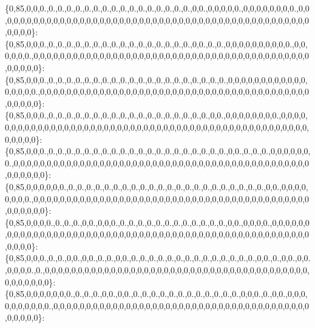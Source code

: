 \{0,85,0,0,0.,0.,0.,0.,0.,0.,0.,0.,0.,0.,0.,0.,0.,0.,0.,0.,0.,0,0.,0,0,0,0,0.,0,0,0,0,0,0,0,0.,0,0,0,0,0,0,0,0,0,0,0,0,0,0,0,0,0,0,0,0,0,0,0,0,0,0,0,0,0,0,0,0,0,0,0,0,0,0,0,0,0,0,0,0,0,0,0,0,0,0,0,0\}\+: \{0,85,0,0,0.,0.,0.,0.,0.,0.,0.,0.,0.,0.,0.,0.,0.,0.,0.,0.,0.,0,0.,0.,0.,0,0,0,0,0,0,0,0,0,0.,0,0,0,0,0,0.,0,0,0,0,0,0,0,0,0,0,0,0,0,0,0,0,0,0,0,0,0,0,0,0,0,0,0,0,0,0,0,0,0,0,0,0,0,0,0,0,0,0,0,0,0,0,0\}\+: \{0,85,0,0,0.,0.,0.,0.,0.,0.,0.,0.,0.,0.,0.,0.,0.,0.,0.,0.,0.,0.,0.,0.,0.,0,0,0,0,0,0,0,0,0,0,0,0,0,0,0,0,0.,0,0,0,0,0,0,0,0,0,0,0,0,0,0,0,0,0,0,0,0,0,0,0,0,0,0,0,0,0,0,0,0,0,0,0,0,0,0,0,0,0,0,0,0,0,0\}\+: \{0,85,0,0,0.,0.,0.,0.,0.,0.,0.,0.,0.,0.,0.,0.,0.,0.,0.,0.,0.,0.,0.,0,0.,0,0,0,0,0,0,0,0.,0,0,0,0,0,0,0,0,0,0,0,0,0,0,0,0,0,0,0,0,0,0,0,0,0,0,0,0,0,0,0,0,0,0,0,0,0,0,0,0,0,0,0,0,0,0,0,0,0,0,0,0,0,0,0\}\+: \{0,85,0,0,0.,0.,0.,0.,0.,0.,0.,0.,0.,0.,0.,0.,0.,0.,0.,0.,0.,0.,0.,0.,0.,0,0.,0.,0.,0.,0,0,0,0,0,0,0.,0,0,0,0,0,0,0,0,0,0,0,0,0,0,0,0,0,0,0,0,0,0,0,0,0,0,0,0,0,0,0,0,0,0,0,0,0,0,0,0,0,0,0,0,0,0,0,0,0,0,0\}\+: \{0,85,0,0,0,0,0,0.,0.,0.,0.,0.,0.,0.,0.,0.,0.,0.,0.,0.,0.,0.,0.,0.,0.,0.,0.,0.,0.,0.,0,0.,0,0,0,0,0,0,0,0.,0,0,0,0,0,0,0,0,0,0,0,0,0,0,0,0,0,0,0,0,0,0,0,0,0,0,0,0,0,0,0,0,0,0,0,0,0,0,0,0,0,0,0,0,0,0,0,0\}\+: \{0,85,0,0,0,0.,0.,0.,0.,0,0.,0,0,0.,0.,0.,0.,0.,0.,0.,0.,0.,0.,0.,0.,0.,0,0.,0,0,0,0.,0,0,0,0,0,0,0,0,0,0,0,0,0,0,0,0,0,0,0,0,0,0,0,0,0,0,0,0,0,0,0,0,0,0,0,0,0,0,0,0,0,0,0,0,0,0,0,0,0,0,0,0,0,0,0,0\}\+: \{0,85,0,0,0.,0.,0.,0,0.,0,0.,0.,0.,0,0.,0.,0.,0.,0.,0.,0.,0.,0.,0.,0.,0.,0.,0.,0.,0,0.,0.,0,0.,0,0.,0,0,0,0.,0.,0,0,0,0,0,0,0,0,0,0,0,0,0,0,0,0,0,0,0,0,0,0,0,0,0,0,0,0,0,0,0,0,0,0,0,0,0,0,0,0,0,0,0,0,0,0,0\}\+: \{0,85,0,0,0,0,0,0,0.,0.,0.,0.,0,0.,0,0.,0.,0.,0.,0.,0.,0.,0.,0.,0.,0.,0.,0.,0,0,0.,0.,0,0.,0,0,0,0,0,0,0,0,0,0.,0,0,0,0,0,0,0,0,0,0,0,0,0,0,0,0,0,0,0,0,0,0,0,0,0,0,0,0,0,0,0,0,0,0,0,0,0,0,0,0,0,0,0,0\}\+: 